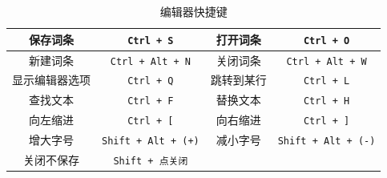 \begin{table}[ht]
\centering
\caption{编辑器快捷键}\label{editor_tab1}
\begin{tabular}{|c|c|c|c|}
\hline
保存词条 & \lstinline|Ctrl + S| & 打开词条 & \lstinline|Ctrl + O| \\
\hline
新建词条 & \lstinline|Ctrl + Alt + N| & 关闭词条 & \lstinline|Ctrl + Alt + W| \\
\hline
显示编辑器选项 & \lstinline|Ctrl + Q| & 跳转到某行 & \lstinline|Ctrl + L| \\
\hline
查找文本 & \lstinline|Ctrl + F| & 替换文本 & \lstinline|Ctrl + H| \\
\hline
向左缩进 & \lstinline|Ctrl + [| & 向右缩进 & \lstinline|Ctrl + ]| \\
\hline
增大字号 & \lstinline|Shift + Alt + (+)| & 减小字号 & \lstinline|Shift + Alt + (-)| \\
\hline
关闭不保存 & \lstinline|Shift + 点关闭| &  &  \\
\hline
\end{tabular}
\end{table}
